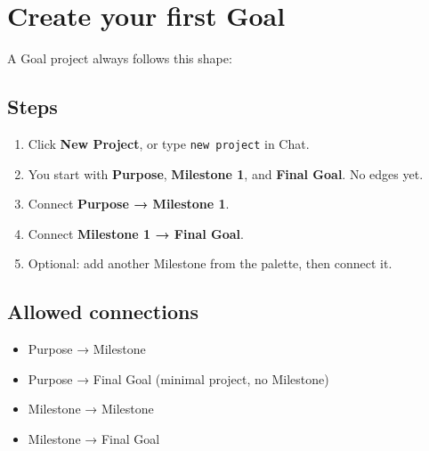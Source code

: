 \documentclass[11pt,a4paper,oneside]{article}
\newcommand{\pathcode}[1]{\texttt{#1}}
\begin{document}
\section{Create your first Goal}
\label{sec:goal}

A Goal project always follows this shape:

\begin{center}
\end{center}

\subsection{Steps}

\begin{enumerate}
  \item Click \textbf{New Project}, or type \pathcode{new project} in Chat.
  \item You start with \textbf{Purpose}, \textbf{Milestone 1}, and \textbf{Final Goal}. No edges yet.
  \item Connect \textbf{Purpose → Milestone 1}.
  \item Connect \textbf{Milestone 1 → Final Goal}.
  \item Optional: add another Milestone from the palette, then connect it.
\end{enumerate}

\subsection{Allowed connections}

\begin{itemize}
  \item Purpose → Milestone
  \item Purpose → Final Goal (minimal project, no Milestone)
  \item Milestone → Milestone
  \item Milestone → Final Goal
\end{itemize}
\end{document}
